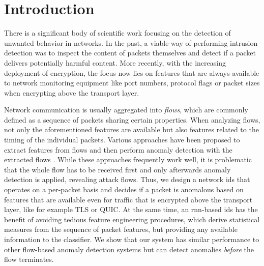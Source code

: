 \documentclass[conference]{IEEEtran}
\begin{document}
\maketitle

\section{Introduction}

There is a significant body of scientific work focusing on the detection of unwanted behavior in networks. In the past, a viable way of performing intrusion detection was to inspect the content of packets themselves and detect if a packet delivers potentially harmful content. More recently, with the increasing deployment of encryption, %
the focus now lies on features that are always available to network monitoring equipment like port numbers, protocol flags or packet sizes when encrypting above the transport layer.

Network communication is usually aggregated into \textit{flows}, which are commonly defined as a sequence of packets sharing certain properties. %
When analyzing flows, not only the aforementioned features are available but also features related to the timing of the individual packets. %
Various approaches have been proposed to extract features from flows and then perform anomaly detection with the extracted flows \cite{meghdouri_analysis_2018}.
While these approaches frequently work well, it is problematic that the whole flow has to be received first and only afterwards anomaly detection is applied, revealing attack flows. Thus, we design a network \gls{ids} that operates on a per-packet basis and decides if a packet is anomalous based on features that are available even for traffic that is encrypted above the transport layer, like for example TLS or QUIC.
At the same time, an \gls{rnn}-based \gls{ids} has the benefit of avoiding tedious feature engineering procedures, which derive statistical measures from the sequence of packet features, but providing any available information to the classifier.
We show that our system has similar performance to other flow-based anomaly detection systems but can detect anomalies \textit{before} the flow terminates.
\end{document}
